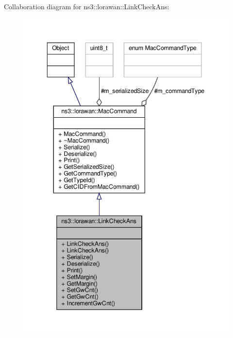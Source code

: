 Collaboration diagram for ns3\+:\+:lorawan\+:\+:Link\+Check\+Ans\+:
\nopagebreak
\begin{figure}[H]
\begin{center}
\leavevmode
\includegraphics[width=343pt]{classns3_1_1lorawan_1_1LinkCheckAns__coll__graph}
\end{center}
\end{figure}
